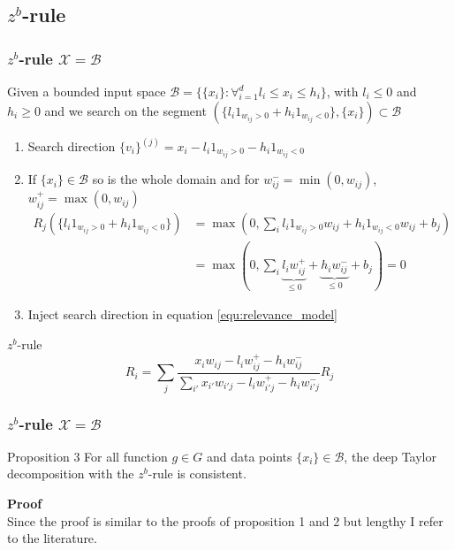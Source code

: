 \documentclass{beamer}
\begin{document}
\subsection[$z^b$-rule]{$z^b$-rule}


\begin{frame}
\frametitle{$z^b$-rule $\mathcal{X}=\mathcal{B}$}
\vspace{0.4cm}
Given a bounded input space $\mathcal{B} = \{\{x_i\} : \forall_{i=1}^d l_i\leq x_i \leq h_i\} $, with $l_i \leq 0$ and $ h_i \geq 0$ and we search on the segment $(\{l_i 1_{w_{ij}>0} + h_i 1_{w_{ij}<0}\},\{x_i\})\subset \mathcal{B}$\\
\begin{enumerate}
	\item Search direction $\{v_i\}^{(j)} = x_i - l_i 1_{w_{ij}>0} - h_i 1_{w_{ij}<0}$
	\item If $\{x_i\} \in \mathcal{B}$ so is the whole domain and for $w_{ij}^-=\min(0,w_{ij})$, $w_{ij}^+=\max(0,w_{ij})$
	\vspace{-0.25cm}
	\begin{align*}
		R_j(\{l_i 1_{w_{ij}>0} + h_i 1_{w_{ij}<0}\}) &= \max(0, \sum_i l_i 1_{w_{ij}>0} w_{ij} + h_i 1_{w_{ij}<0} w_{ij} + b_j)\\
		&=\max(0, \sum_i \underbrace{l_i w_{ij}^+}_{\leq 0} + \underbrace{h_i w_{ij}^-}_{\leq 0} + b_j)= 0
	\end{align*}
	\vspace{-0.75cm}
	\item Inject search direction in equation \eqref{equ:relevance_model}
\end{enumerate}

\pause
\vspace{-0.15cm}
\begin{block}{$z^b$-rule}
\begin{equation*}
R_i =  \sum_j \frac{x_i w_{ij} - l_i w_{ij}^+ - h_i w_{ij}^-}{\sum_{i'} x_{i'} w_{i'j}  - l_i w_{i'j}^+ - h_i w_{i'j}^-} R_j
\end{equation*}
\end{block}
\end{frame}



\begin{frame}
\frametitle{$z^b$-rule $\mathcal{X}=\mathcal{B}$}
\vspace{-0.4cm}
\begin{block}{Proposition 3}
For all function $g \in G$ and data points $\{x_i\} \in \mathcal{B}$, the deep Taylor decomposition with the $z^b$-rule is consistent.
\end{block}
\vspace{0.5cm}
\textbf{Proof}\\
Since the proof is similar to the proofs of proposition 1 and 2 but lengthy I refer to the literature.

\end{frame}
\end{document}
